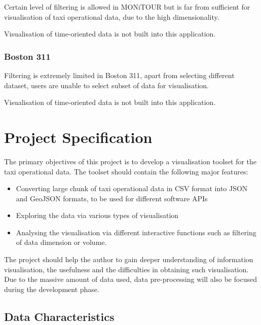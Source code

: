 \documentclass[11pt,a4paper]{article}
\begin{document}
Certain level of filtering is allowed in MONiTOUR but is far from sufficient for visualisation of taxi operational data, due to the high dimensionality.

Visualisation of time-oriented data is not built into this application.

\subsubsection{Boston 311}

Filtering is extremely limited in Boston 311, apart from selecting different dataset, users are unable to select subset of data for visualisation.

Visualisation of time-oriented data is not built into this application.

\section{Project Specification}
\label{sec3}

The primary objectives of this project is to develop a visualisation toolset for the taxi operational data. The toolset should contain the following major features:
\begin{itemize}
	\item Converting large chunk of taxi operational data in CSV format into JSON and GeoJSON formats, to be used for different software APIs
	\item Exploring the data via various types of visualisation
	\item Analysing the visualisation via different interactive functions such as filtering of data dimension or volume. 
\end{itemize}

The project should help the author to gain deeper understanding of information visualisation, the usefulness and the difficulties in obtaining such visualisation. Due to the massive amount of data used, data pre-processing will also be focused during the development phase.

\subsection{Data Characteristics}
\label{sec:datacharacteristics}
\end{document}
